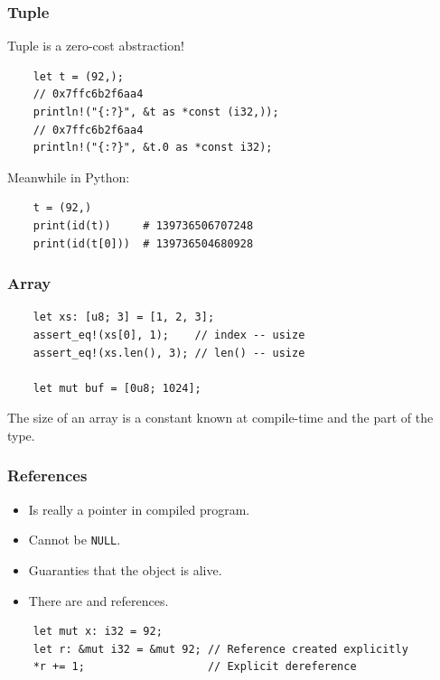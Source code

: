 \documentclass[aspectratio=1610,t]{beamer}
\begin{document}

\begin{frame}[fragile]
\frametitle{Tuple}
Tuple is a zero-cost abstraction!

\begin{verbatim}
    let t = (92,);
    // 0x7ffc6b2f6aa4
    println!("{:?}", &t as *const (i32,));
    // 0x7ffc6b2f6aa4
    println!("{:?}", &t.0 as *const i32);
\end{verbatim}

Meanwhile in Python:

\begin{verbatim}
    t = (92,)
    print(id(t))     # 139736506707248
    print(id(t[0]))  # 139736504680928
\end{verbatim}
\end{frame}


\begin{frame}[fragile]
\frametitle{Array}
\begin{verbatim}
    let xs: [u8; 3] = [1, 2, 3];
    assert_eq!(xs[0], 1);    // index -- usize
    assert_eq!(xs.len(), 3); // len() -- usize

    let mut buf = [0u8; 1024];
\end{verbatim}

The size of an array is a constant known at compile-time and the part of the type.
\end{frame}


\begin{frame}[fragile]
\frametitle{References}
\begin{itemize}
    \item Is really a pointer in compiled program.
    \item Cannot be \texttt{NULL}.
    \item Guaranties that the object is alive.
    \item There are \textt{\&} and  references.
\end{itemize}

\begin{verbatim}
    let mut x: i32 = 92;
    let r: &mut i32 = &mut 92; // Reference created explicitly
    *r += 1;                   // Explicit dereference
\end{verbatim}
\end{frame}
\end{document}
